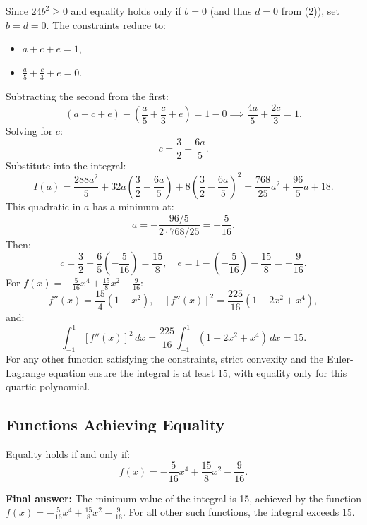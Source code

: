 \documentclass[12pt,a4paper]{article}
\theoremstyle{definition}
\begin{document}
    Since $24b^2 \geq 0$ and equality holds only if $b = 0$ (and thus $d = 0$ from (2)), set $b = d = 0$. The constraints reduce to:
    \begin{itemize}
        \item $a + c + e = 1$,
        \item $\frac{a}{5} + \frac{c}{3} + e = 0$.
    \end{itemize}

    Subtracting the second from the first:
    \[
        (a + c + e) - \left( \frac{a}{5} + \frac{c}{3} + e \right) = 1 - 0 \implies \frac{4a}{5} + \frac{2c}{3} = 1.
    \]
    Solving for $c$:
    \[
        c = \frac{3}{2} - \frac{6a}{5}.
    \]
    Substitute into the integral:
    \[
        I(a) = \frac{288a^2}{5} + 32a \left( \frac{3}{2} - \frac{6a}{5} \right) + 8 \left( \frac{3}{2} - \frac{6a}{5} \right)^2 = \frac{768}{25} a^2 + \frac{96}{5} a + 18.
    \]
    This quadratic in $a$ has a minimum at:
    \[
        a = -\frac{96/5}{2 \cdot 768/25} = -\frac{5}{16}.
    \]
    Then:
    \[
        c = \frac{3}{2} - \frac{6}{5} \left( -\frac{5}{16} \right) = \frac{15}{8}, \quad e = 1 - \left( -\frac{5}{16} \right) - \frac{15}{8} = -\frac{9}{16}.
    \]
    For $f(x) = -\frac{5}{16} x^4 + \frac{15}{8} x^2 - \frac{9}{16}$:
    \[
        f''(x) = \frac{15}{4} (1 - x^2), \quad [f''(x)]^2 = \frac{225}{16} (1 - 2x^2 + x^4),
    \]
    and:
    \[
        \int_{-1}^{1} [f''(x)]^2 \, dx = \frac{225}{16} \int_{-1}^{1} (1 - 2x^2 + x^4) \, dx = 15.
    \]
    For any other function satisfying the constraints, strict convexity and the Euler-Lagrange equation ensure the integral is at least 15, with equality only for this quartic polynomial.

    \subsection*{Functions Achieving Equality}
    Equality holds if and only if:
    \[
        f(x) = -\frac{5}{16} x^4 + \frac{15}{8} x^2 - \frac{9}{16}.
    \]

    \textbf{Final answer:} The minimum value of the integral is 15, achieved by the function $f(x) = -\frac{5}{16} x^4 + \frac{15}{8} x^2 - \frac{9}{16}$. For all other such functions, the integral exceeds 15.

\end{document}
